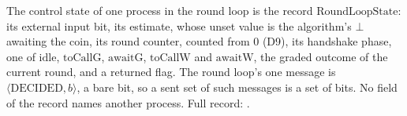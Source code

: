 \begin{definition}
  \label{def:aba-core-vocab}
  \leanok
  The control state of one process in the round loop is the record $\mathrm{RoundLoopState}$: its external input bit, its estimate, whose unset value is the algorithm's $\bot$ awaiting the coin, its round counter, counted from $0$ (D9), its handshake phase, one of $\mathrm{idle}$, $\mathrm{toCallG}$, $\mathrm{awaitG}$, $\mathrm{toCallW}$ and $\mathrm{awaitW}$, the graded outcome of the current round, and a returned flag.
  The round loop's one message is $\langle\mathrm{DECIDED},b\rangle$, a bare bit, so a sent set of such messages is a set of bits.
  No field of the record names another process.
  Full record: .
\end{definition}
